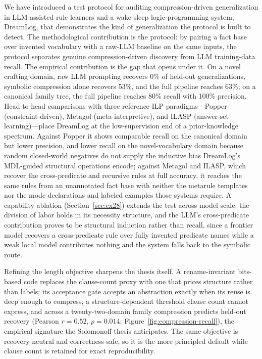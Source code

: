 \documentclass[10pt,conference]{IEEEtran}
\begin{document}
We have introduced a test protocol for auditing compression-driven generalization in LLM-assisted rule learners and a wake-sleep logic-programming system, DreamLog, that demonstrates the kind of generalization the protocol is built to detect. The methodological contribution is the protocol: by pairing a fact base over invented vocabulary with a raw-LLM baseline on the same inputs, the protocol separates genuine compression-driven discovery from LLM training-data recall. The empirical contribution is the gap that opens under it. On a novel crafting domain, raw LLM prompting recovers 0\% of held-out generalizations, symbolic compression alone recovers 53\%, and the full pipeline reaches 63\%; on a canonical family tree, the full pipeline reaches 80\% recall with 100\% precision. Head-to-head comparisons with three reference ILP paradigms---Popper (constraint-driven), Metagol (meta-interpretive), and ILASP (answer-set learning)---place DreamLog at the low-supervision end of a prior-knowledge spectrum. Against Popper it shows comparable recall on the canonical domain but lower precision, and lower recall on the novel-vocabulary domain because random closed-world negatives do not supply the inductive bias DreamLog's MDL-guided structural operations encode; against Metagol and ILASP, which recover the cross-predicate and recursive rules at full accuracy, it reaches the same rules from an unannotated fact base with neither the metarule templates nor the mode declarations and labeled examples those systems require. A capability ablation (Section~\ref{sec:ex28}) extends the test across model scale: the division of labor holds in its necessity structure, and the LLM's cross-predicate contribution proves to be structural induction rather than recall, since a frontier model recovers a cross-predicate rule over fully invented predicate names while a weak local model contributes nothing and the system falls back to the symbolic route.

Refining the length objective sharpens the thesis itself. A rename-invariant bits-based code replaces the clause-count proxy with one that prices structure rather than labels; its acceptance gate accepts an abstraction exactly when its reuse is deep enough to compress, a structure-dependent threshold clause count cannot express, and across a twenty-two-domain family compression predicts held-out recovery (Pearson $r=0.52$, $p=0.014$; Figure~\ref{fig:compression-recall}), the empirical signature the Solomonoff thesis anticipates. The same objective is recovery-neutral and correctness-safe, so it is the more principled default while clause count is retained for exact reproducibility.
\end{document}
